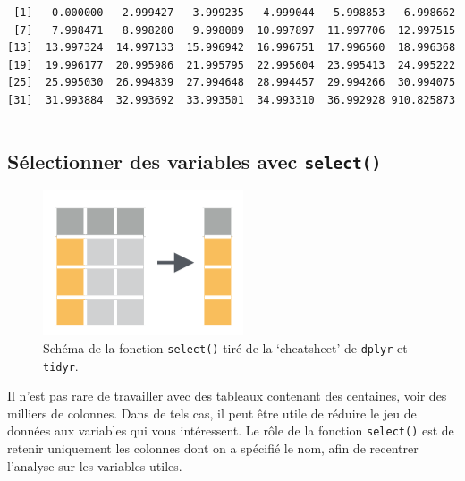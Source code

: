 \documentclass[
  a4paper,
]{article}
\begin{document}
\begin{verbatim}
 [1]   0.000000   2.999427   3.999235   4.999044   5.998853   6.998662
 [7]   7.998471   8.998280   9.998089  10.997897  11.997706  12.997515
[13]  13.997324  14.997133  15.996942  16.996751  17.996560  18.996368
[19]  19.996177  20.995986  21.995795  22.995604  23.995413  24.995222
[25]  25.995030  26.994839  27.994648  28.994457  29.994266  30.994075
[31]  31.993884  32.993692  33.993501  34.993310  36.992928 910.825873
\end{verbatim}

\begin{center}\rule{0.5\linewidth}{0.5pt}\end{center}

\hypertarget{suxe9lectionner-des-variables-avec-select}{%
\subsection{\texorpdfstring{Sélectionner des variables avec \texttt{select()}}{Sélectionner des variables avec select()}}\label{suxe9lectionner-des-variables-avec-select}}

\begin{figure}[htpb]

{\centering \includegraphics[width=0.5\linewidth]{images/select} 

}

\caption{Schéma de la fonction \texttt{select()} tiré de la `cheatsheet' de \texttt{dplyr} et \texttt{tidyr}.}\label{fig:selectfig}
\end{figure}



Il n'est pas rare de travailler avec des tableaux contenant des centaines, voir des milliers de colonnes. Dans de tels cas, il peut être utile de réduire le jeu de données aux variables qui vous intéressent. Le rôle de la fonction \texttt{select()} est de retenir uniquement les colonnes dont on a spécifié le nom, afin de recentrer l'analyse sur les variables utiles.
\end{document}
